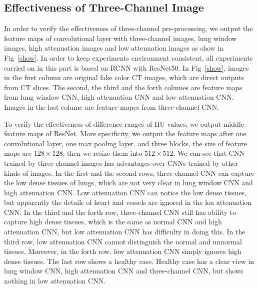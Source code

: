 \documentclass[journal]{IEEEtran}
\begin{document}
\subsection{Effectiveness of Three-Channel Image}
\label{effectiveness}
In order to verify the effectiveness of three-channel pre-processing, we output the feature maps of convolutional layer with three-channel images, lung window images, high attenuation images and low attenuation images as show in Fig~\ref{show}. In order to keep experiments environment consistent, all experiments carried on in this part is based on RCNN with ResNet50. In Fig~\ref{show}, images in the first column are original fake color CT images, which are direct outputs from CT slices. The second, the third and the forth columes are feature maps from lung window CNN, high attenuation CNN and low attenuation CNN. Images in the last colume are feature mapes from three-channel CNN.

To verify the effectiveness of difference ranges of HU values, we output middle feature maps of ResNet. More specificity, we output the feature maps after one convolutional layer, one max pooling layer, and three blocks, the size of feature maps are $128 \times 128$, then we resize them into $512 \times 512$. We can see that CNN trained by three-channel images has advantages over CNNs trained by other kinds of images. In the first and the second rows, three-channel CNN can capture the low dense tissues of lungs, which are not very clear in lung window CNN and high attenuation CNN. Low attenuation CNN can notice the low dense tissues, but apparently the details of heart and vessels are ignored in the loa attenuation CNN. 
In the third and the forth row, three-channel CNN still has ability to capture high dense tissues, which is the same as normal CNN and high attenuation CNN, but low attenuation CNN has difficulty in doing this. In the third row, low attenuation CNN cannot distinguish the normal and unnormal tissues. Moreover, in the forth row, low attenuation CNN simply ignores high dense tissues. The last row shows a healthy case. Healthy case has a clear view in lung window CNN, high attenuation CNN and three-channel CNN, but shows nothing in low attenuation CNN.
\end{document}
